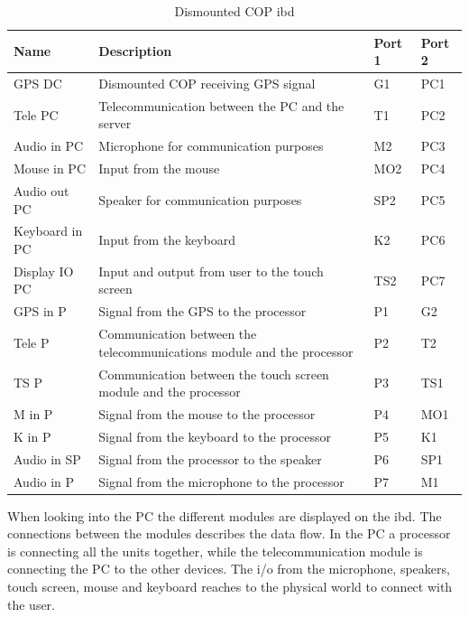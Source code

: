 \begin{table}[H]  
\centering

\begin{tabular}{|l|p{8cm}|l|l|} 
\hline
	\textbf{Name}		& \textbf{Description} & \textbf{Port 1} & \textbf{Port 2} \\\hline
GPS DC	    & Dismounted COP receiving GPS signal												 & G1 &  PC1 \\\hline
Tele PC     & Telecommunication between the PC and the server							   		 & T1 &  PC2 \\\hline		
Audio in PC & Microphone for communication purposes  											 & M2 &  PC3 \\\hline				  
Mouse in PC	    & Input from the mouse										 					 & MO2 &  PC4\\\hline				  
Audio out PC	        & Speaker for communication purposes 			  						 & SP2 & PC5 \\\hline			
Keyboard in PC	& Input from the keyboard   				 				 					 & K2 &  PC6 \\\hline				  
Display IO PC	& Input and output from user to the touch screen								 & TS2 &  PC7 \\\hline				  
	
GPS in P	& Signal from the GPS to the processor								                 & P1 & G2 \\\hline				  			
Tele P		& Communication between the telecommunications module and the processor              & P2 & T2 \\\hline				  			
TS P		& Communication between the touch screen module and the processor          			 & P3 & TS1 \\\hline			  			
M in P		& Signal from the mouse to the processor          								     & P4 & MO1 \\\hline				  	
K in P		& Signal from the keyboard to the processor          								 & P5 & K1 \\\hline				  			
Audio in SP	& Signal from the processor to the speaker					             			 & P6 & SP1 \\\hline				  		Audio in P	& Signal from the microphone to the processor					           		     & P7 & M1 \\\hline				  			
												   
\end{tabular}
\caption {Dismounted COP ibd} 
\end{table} 





When looking into the PC the different modules are displayed on the ibd. The connections between the modules describes the data flow. In the PC a processor is connecting all the units together, while the telecommunication module is connecting the PC to the other devices. The i/o from the microphone, speakers, touch screen, mouse and keyboard reaches to the physical world to connect with the user.


